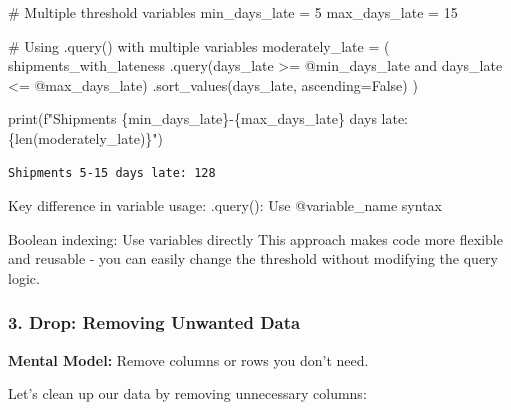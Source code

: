 \documentclass[
  letterpaper,
  DIV=11,
  numbers=noendperiod]{scrartcl}
\newenvironment{Shaded}{\begin{snugshade}}{\end{snugshade}}
\newcommand{\BuiltInTok}[1]{\textcolor[rgb]{0.00,0.23,0.31}{#1}}
\newcommand{\CommentTok}[1]{\textcolor[rgb]{0.37,0.37,0.37}{#1}}
\newcommand{\DecValTok}[1]{\textcolor[rgb]{0.68,0.00,0.00}{#1}}
\newcommand{\NormalTok}[1]{\textcolor[rgb]{0.00,0.23,0.31}{#1}}
\newcommand{\OperatorTok}[1]{\textcolor[rgb]{0.37,0.37,0.37}{#1}}
\newcommand{\SpecialCharTok}[1]{\textcolor[rgb]{0.37,0.37,0.37}{#1}}
\newcommand{\SpecialStringTok}[1]{\textcolor[rgb]{0.13,0.47,0.30}{#1}}
\newcommand{\StringTok}[1]{\textcolor[rgb]{0.13,0.47,0.30}{#1}}
\newcommand{\VariableTok}[1]{\textcolor[rgb]{0.07,0.07,0.07}{#1}}
\begin{document}
\begin{Shaded}
\begin{Highlighting}[]
\CommentTok{\# Multiple threshold variables}
\NormalTok{min\_days\_late }\OperatorTok{=} \DecValTok{5}
\NormalTok{max\_days\_late }\OperatorTok{=} \DecValTok{15}

\CommentTok{\# Using .query() with multiple variables}
\NormalTok{moderately\_late }\OperatorTok{=}\NormalTok{ (}
\NormalTok{    shipments\_with\_lateness}
\NormalTok{    .query(}\StringTok{\textquotesingle{}days\_late \textgreater{}= @min\_days\_late and days\_late \textless{}= @max\_days\_late\textquotesingle{}}\NormalTok{)}
\NormalTok{    .sort\_values(}\StringTok{\textquotesingle{}days\_late\textquotesingle{}}\NormalTok{, ascending}\OperatorTok{=}\VariableTok{False}\NormalTok{)}
\NormalTok{)}

\BuiltInTok{print}\NormalTok{(}\SpecialStringTok{f"Shipments }\SpecialCharTok{\{}\NormalTok{min\_days\_late}\SpecialCharTok{\}}\SpecialStringTok{{-}}\SpecialCharTok{\{}\NormalTok{max\_days\_late}\SpecialCharTok{\}}\SpecialStringTok{ days late: }\SpecialCharTok{\{}\BuiltInTok{len}\NormalTok{(moderately\_late)}\SpecialCharTok{\}}\SpecialStringTok{"}\NormalTok{)}
\end{Highlighting}
\end{Shaded}

\begin{verbatim}
Shipments 5-15 days late: 128
\end{verbatim}

Key difference in variable usage: .query(): Use @variable\_name syntax

Boolean indexing: Use variables directly This approach makes code more
flexible and reusable - you can easily change the threshold without
modifying the query logic.

\subsubsection{3. Drop: Removing Unwanted
Data}\label{drop-removing-unwanted-data}

\textbf{Mental Model:} Remove columns or rows you don't need.

Let's clean up our data by removing unnecessary columns:
\end{document}
